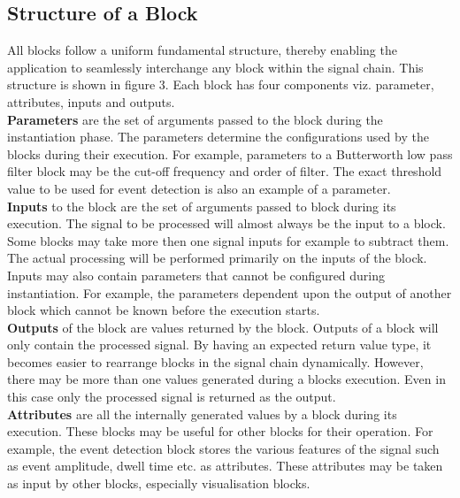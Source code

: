 \documentclass[journal]{IEEEtran}
\begin{document}
\subsection{Structure of a Block}
All blocks follow a uniform fundamental structure, thereby enabling the application to seamlessly interchange any block within the signal chain. This structure is shown in figure 3. Each block has four components viz. parameter, attributes, inputs and outputs. \\
{\bf{Parameters}} are the set of arguments passed to the block during the instantiation phase. The parameters determine the configurations used by the blocks during their execution. For example, parameters to a Butterworth low pass filter block may be the cut-off frequency and order of filter. The exact threshold value to be used for event detection is also an example of a parameter. \\
{\bf{Inputs}} to the block are the set of arguments passed to block during its execution. The signal to be processed will almost always be the input to a block. Some blocks may take more then one signal inputs for example to subtract them. The actual processing will be performed primarily on the inputs of the block. Inputs may also contain parameters that cannot be configured during instantiation. For example, the parameters dependent upon the output of another block which cannot be known before the execution starts. \\
{\bf{Outputs}} of the block are values returned by the block. Outputs of a block will only contain the processed signal. By having an expected return value type, it becomes easier to rearrange blocks in the signal chain dynamically. However, there may be more than one values generated during a blocks execution. Even in this case only the processed signal is returned as the output. \\
{\bf{Attributes}} are all the internally generated values by a block during its execution. These blocks may be useful for other blocks for their operation. For example, the event detection block stores the various features of the signal such as event amplitude, dwell time etc. as attributes. These attributes may be taken as input by other blocks, especially visualisation blocks.
\end{document}
